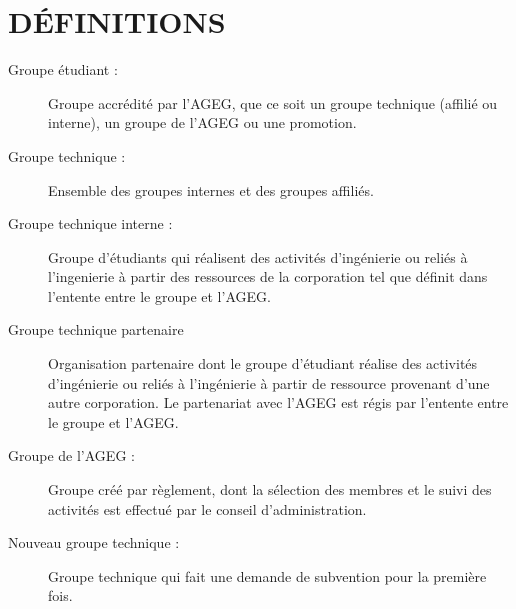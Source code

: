 \chapter*{DÉFINITIONS}
\begin{description}
\item[Groupe étudiant :]{Groupe accrédité par l'AGEG, que ce soit un groupe technique (affilié ou interne), un groupe de l'AGEG ou une promotion.}
\item[Groupe technique :]{Ensemble des groupes internes et des groupes affiliés.}
\item[Groupe technique interne :]{Groupe d'étudiants qui réalisent des activités d'ingénierie ou reliés à l'ingenierie à partir des ressources de la corporation tel que définit dans l'entente entre le groupe et l'AGEG.}
\item[Groupe technique partenaire]{Organisation  partenaire dont  le  groupe  d’étudiant  réalise  des  activités  d’ingénierie  ou  reliés  à l’ingénierie  à  partir  de  ressource  provenant  d’une  autre  corporation. Le partenariat  avec  l’AGEG  est  régis  par  l’entente  entre  le  groupe  et l’AGEG.}
\item[Groupe de l’AGEG :]{Groupe créé par règlement, dont la sélection des membres et le suivi des activités est effectué par le conseil d'administration.}
\item[Nouveau groupe technique :]{Groupe technique qui fait une demande de subvention pour la première fois.}

\end{description}
\vspace{5mm}
